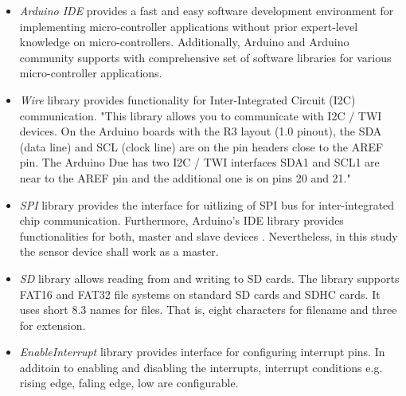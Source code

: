 \documentclass[english,12pt,a4paper,pdftex,elec,utf8]{aaltothesis}
\begin{document}
\begin{itemize}
\item \textit{Arduino IDE} provides a fast and easy software development environment for implementing micro-controller applications without prior expert-level knowledge on micro-controllers. Additionally, Arduino and Arduino community supports with comprehensive set of software libraries for various micro-controller applications.

\item \textit{Wire} library provides functionality for Inter-Integrated Circuit (I2C) communication. "This library allows you to communicate with I2C / TWI devices. On the Arduino boards with the R3 layout (1.0 pinout), the SDA (data line) and SCL (clock line) are on the pin headers close to the AREF pin. The Arduino Due has two I2C / TWI interfaces SDA1 and SCL1 are near to the AREF pin and the additional one is on pins 20 and 21." \cite{arduinowire}

\item \textit{SPI} library provides the interface for uitlizing of SPI bus for inter-integrated chip communication. Furthermore, Arduino's IDE library provides functionalities for both, master and slave devices \cite{arduinospi}. Nevertheless, in this study the sensor device shall work as a master. 

\item \textit{SD} library allows reading from and writing to SD cards. The library supports FAT16 and FAT32 file systems on standard SD cards and SDHC cards. It uses short 8.3 names for files. That is, eight characters for filename and three for extension. \cite{arduinosd}

\item \textit{EnableInterrupt} library provides interface for configuring interrupt pins. In additoin to enabling and disabling the interrupts, interrupt conditions e.g. rising edge, faling edge, low are configurable. \cite{arduinoenableinterrupt}


\end{itemize}
\end{document}
